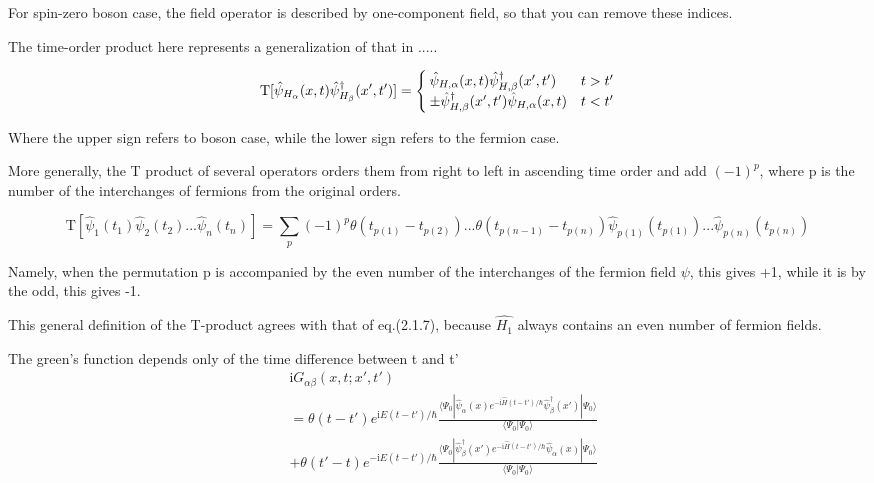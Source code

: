 ﻿\documentclass[twoside]{book}
\numberwithin{equation}{section}
\begin{document}
For spin-zero boson case, the field operator is described by one-component field, so that you can remove these indices.

The time-order product here represents a generalization of that in .....

\begin{equation}
\mathrm{T}[\hat \psi_{H_{\alpha}}(x,t)\hat \psi^{\dagger}_{H_{\beta}}(x',t')]=\begin{cases}
\hat \psi_{H,\alpha}(x,t)\hat \psi^{\dagger}_{H,\beta}(x',t') &t>t' \cr  \pm \hat \psi^{\dagger}_{H,\beta}(x',t')\hat \psi_{H,\alpha}(x,t) &t<t'
\end{cases}\nonumber
\end{equation}

Where the upper sign refers to boson case, while the lower sign refers to the fermion case.

More generally, the T product of several operators orders them from right to left in ascending time order and add $(-1)^p$, where p is the number of the interchanges of fermions from the original orders.

\begin{equation}\label{2.3.2}
\mathrm{T}[\hat \psi_1(t_1)\hat \psi_2(t_2)...\hat \psi_n(t_n)]=\sum_{p}(-1)^p\theta(t_{p(1)}-t_{p(2)})...\theta(t_{p(n-1)}-t_{p(n)})\hat \psi_{p(1)}(t_{p(1)})...\hat \psi_{p(n)}(t_{p(n)}) 
\end{equation}

Namely, when the permutation p is accompanied by the even number of the interchanges of the fermion field $\psi$, this gives +1, while it is by the odd, this gives -1.

This general definition of the T-product agrees with that of eq.(2.1.7), because $\hat{H_1}$ always contains an even number of fermion fields.

The green's function depends only of the time difference between t and t'
\begin{align}
&\mathrm{i}G_{\alpha\beta}(x,t;x',t') \nonumber \\
&=\theta(t-t')e^{\mathrm{i}E(t-t')/\hbar}\frac{\langle\Psi_0|\hat \psi_{\alpha}(x)e^{-\mathrm{i}\hat{H}(t-t')/\hbar}\hat \psi^{
\dagger}_{\beta}(x')|\Psi_0\rangle}{\langle\Psi_0|\Psi_0\rangle} \nonumber \\
&+\theta(t'-t)e^{-\mathrm{i}E(t-t')/\hbar}\frac{\langle\Psi_0|\hat \psi^{
\dagger}_{\beta}(x')e^{-\mathrm{i}\hat{H}(t-t')/\hbar}\hat \psi_{\alpha}(x)|\Psi_0\rangle}{\langle\Psi_0|\Psi_0\rangle} \nonumber
\end{align}
\end{document}
